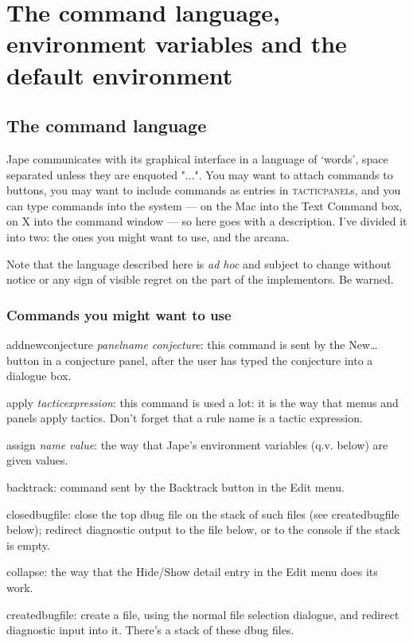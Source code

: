 \chapter{The command language, environment variables and the default environment}
\label{appx:GUIlang}


\section{The command language}


Jape communicates with its graphical interface in a language of `words', space separated unless they are enquoted "...". You may want to attach commands to buttons, you may want to include commands as entries in \textsc{tacticpanel}s, and you can type commands into the system --- on the Mac into the Text Command box, on X into the command window --- so here goes with a description. I've divided it into two: the ones you might want to use, and the arcana.


Note that the language described here is \textit{ad hoc} and subject to change without notice or any sign of visible regret on the part of the implementors. Be warned.


\subsection{Commands you might want to use}


addnewconjecture \textit{panelname} \textit{conjecture}: this command is sent by the New\dots  button in a conjecture panel, after the user has typed the conjecture into a dialogue box.

apply \textit{tacticexpression}: this command is used a lot: it is the way that menus and panels apply tactics. Don't forget that a rule name is a tactic expression.


assign \textit{name} \textit{value}: the way that Jape's environment variables (q.v. below) are given values.


backtrack: command sent by the Backtrack button in the Edit menu.


closedbugfile: close the top dbug file on the stack of such files (see createdbugfile below); redirect diagnostic output to the file below, or to the console if the stack is empty.


collapse: the way that the Hide/Show detail entry in the Edit menu does its work.


createdbugfile: create a file, using the normal file selection dialogue, and redirect diagnostic input into it. There's a stack of these dbug files.


